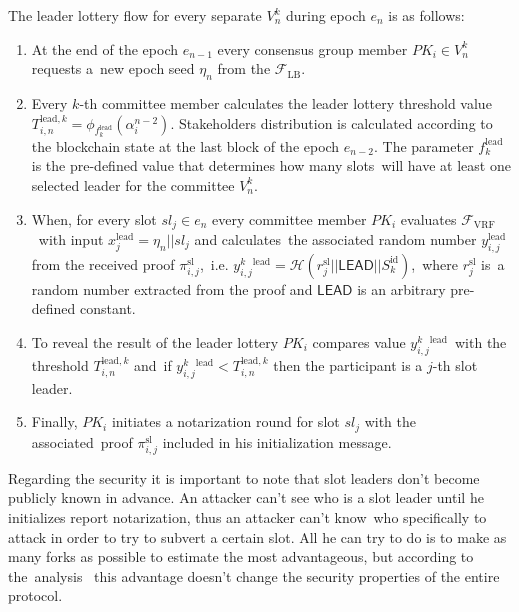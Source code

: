 The leader lottery flow for every separate $V_n^k$ during epoch $e_n$ is as follows:
\begin{enumerate}
    \item At the end of the epoch $e_{n-1}$ every consensus group member $PK_i \in V_n^k$ requests a\
    new epoch seed $\eta_n$ from the ${\mathcal{F}}_{\text{LB}}$.
    \item Every $k$-th committee member calculates the leader lottery threshold value\
    $T_{i, n}^{\text{lead}, k} = \phi_{f^{\text{lead}}_k}(\alpha_{i}^{n - 2})$.
    Stakeholders distribution is calculated according to the blockchain state at the last block of the epoch $e_{n - 2}$.
    The parameter $f^{\text{lead}}_k$ is the pre-defined value that determines how many slots\
    will have at least one selected leader for the committee $V_n^k$.
    \item When, for every slot $sl_j \in e_n$ every committee member $PK_i$ evaluates ${\mathcal{F}}_{\text{VRF}}$\
    with input $x_{j}^{\text{lead}} = \eta_n || sl_j $ and calculates\
    the associated random number $y_{i, j}^{\text{lead}}$ from the received proof $\pi_{i, j}^{\text{sl}}$,\
    i.e. ${y^k_{i, j}^{\text{lead}} = \mathcal{H}(r_{j}^{\text{sl}}||\textsf{LEAD}||S_k^{\text{id}})}$,\
    where $r_{j}^{\text{sl}}$ is\
    a random number extracted from the proof and $\textsf{LEAD}$ is an arbitrary pre-defined constant.
    \item To reveal the result of the leader lottery $PK_i$ compares value $y^k_{i, j}^{\text{lead}}$\
    with the threshold $T_{i, n}^{\text{lead}, k}$ and\
    if ${y^k_{i, j}^{\text{lead}} < T_{i, n}^{\text{lead}, k}}$ then the participant is a $j$-th slot leader.\
    \item Finally, $PK_i$ initiates a notarization round for slot $sl_j$ with the associated\
    proof $\pi_{i, j}^{\text{sl}}$ included in his initialization message.
\end{enumerate}

Regarding the security it is important to note that slot leaders don't become publicly known in advance.
An attacker can't see who is a slot leader until he initializes report notarization, thus an attacker can't know\
who specifically to attack in order to try to subvert a certain slot.
All he can try to do is to make as many forks as possible to estimate the most advantageous, but according to the\
analysis~\cite{cryptoeprint:2017/573} this advantage doesn't change the security properties of the entire protocol.

